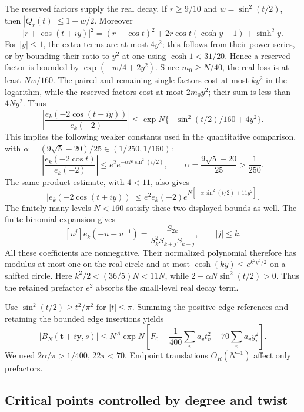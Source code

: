 The reserved factors supply the real decay. If $r\ge9/10$ and
$w=\sin^2(t/2)$, then $|Q_r(t)|\le1-w/2$. Moreover
\[
 |r+\cos(t+iy)|^2=(r+\cos t)^2
       +2r\cos t(\cosh y-1)+\sinh^2y.
\]
For $|y|\le1$, the extra terms are at most $4y^2$; this follows
from their power series, or by bounding their ratio to $y^2$ at
one using $\cosh1<31/20$. Hence a reserved factor is bounded by
$\exp(-w/4+2y^2)$. Since $m_0\ge N/40$, the real loss is
at least $Nw/160$. The paired and remaining single factors cost
at most $ky^2$ in the logarithm, while the reserved factors cost
at most $2m_0y^2$; their sum is less than $4Ny^2$. Thus
\[
 \left|\frac{e_k(-2\cos(t+iy))}{e_k(-2)}\right|
 \le \exp N\{-\sin^2(t/2)/160+4y^2\}.
\]
This implies the following weaker constants used in the quantitative
comparison, with $\alpha=(9\sqrt5-20)/25\in(1/250,1/160)$:
\begin{equation}
\left|\frac{e_k(-2\cos t)}{e_k(-2)}\right|
 \le e^2e^{-\alpha N\sin^2(t/2)},\qquad
 \alpha=\frac{9\sqrt5-20}{25}>\frac1{250}.
\label{eq:qe-18}
\end{equation}
The same product estimate, with $4<11$, also gives
\begin{equation}
|e_k(-2\cos(t+iy))|
 \le e^2e_k(-2)
              e^{N[-\alpha\sin^2(t/2)+11y^2]}.
\label{eq:qe-19}
\end{equation}
The finitely many levels $N<160$ satisfy these two displayed
bounds as well. The finite binomial expansion gives
\[
 [u^j]e_k(-u-u^{-1})=
 \frac{S_{2k}}{S_k^2S_{k+j}S_{k-j}},\qquad |j|\le k.
\]
All these coefficients are nonnegative. Their normalized polynomial
therefore has modulus at most
one on the real circle and at most $\cosh(ky)\le e^{k^2y^2/2}$
on a shifted circle. Here $k^2/2<(36/5)N<11N$, while
$2-\alpha N\sin^2(t/2)>0$. Thus the retained prefactor $e^2$
absorbs the small-level real decay term.

Use \(\sin^2(t/2)\ge t^2/\pi^2\) for \(|t|\le\pi\). Summing the positive edge references and retaining the bounded edge insertions yields
\begin{equation}
|B_N(\mathbf t+i\mathbf y,s)|
 \le N^A\exp N\left[
  F_0-\frac1{400}\sum_va_vt_v^2+70\sum_va_vy_v^2\right].
\label{eq:qe-20}
\end{equation}
We used \(2\alpha/\pi>1/400\), \(22\pi<70\). Endpoint translations \(O_R(N^{-1})\) affect only prefactors.

\subsection{Critical points controlled by degree and twist}\label{sec:qe-7}

